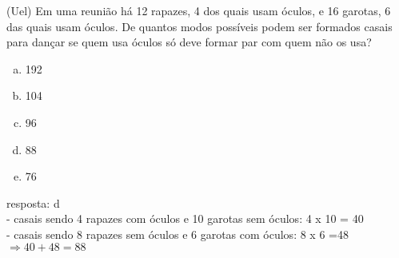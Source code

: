 \begin{ex}
 (Uel) Em uma reunião há 12 rapazes, 4 dos quais usam óculos, e 16 garotas, 6 das quais usam óculos. De quantos modos possíveis podem ser formados casais para dançar se quem usa óculos só deve formar par com quem não os usa?
    \begin{enumerate}[(a)]
    \item 192
    \item 104
    \item 96
    \item 88
    \item 76
    \end{enumerate}
      \begin{sol}
       resposta: d \\
       - casais sendo 4 rapazes com óculos e 10 garotas sem óculos: 4 x 10 = 40\\
       - casais sendo 8 rapazes sem óculos e 6 garotas com óculos: 8 x 6 =48 \\
        $\Longrightarrow 40 + 48 = 88$        
       
      \end{sol}
\end{ex}